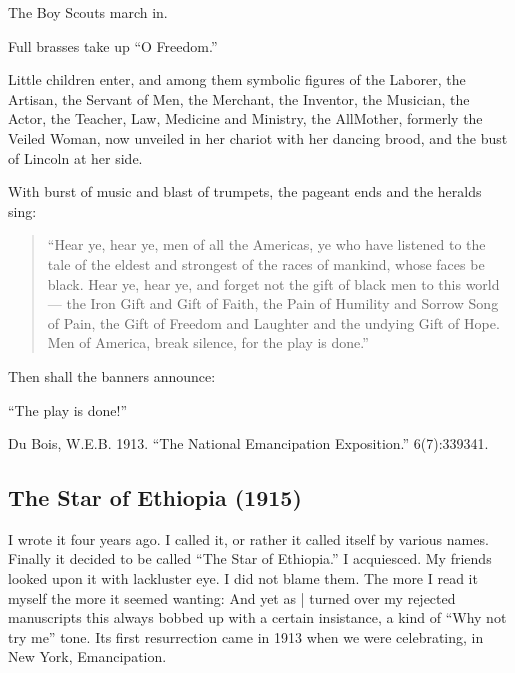\documentclass[letterpaper,10pt,english]{jupyterBook}
\begin{document}
\sphinxAtStartPar
The Boy Scouts march in.

\sphinxAtStartPar
Full brasses take up “O Freedom.”

\sphinxAtStartPar
Little children enter, and among them symbolic figures of the Laborer, the Artisan, the Servant of Men, the Merchant, the Inventor, the Musician, the Actor, the Teacher, Law, Medicine and Ministry, the All\sphinxhyphen{}Mother, formerly the Veiled Woman, now unveiled in her chariot with her dancing brood, and the bust of Lincoln at her side.

\sphinxAtStartPar
With burst of music and blast of trumpets, the pageant ends and the heralds sing:
\begin{quote}

\sphinxAtStartPar
“Hear ye, hear ye, men of all the Americas, ye who have listened to the tale of the eldest and strongest of the races of mankind, whose faces be black. Hear ye, hear ye, and forget not the gift of black men to this world— the Iron Gift and Gift of Faith, the Pain of Humility and Sorrow Song of Pain, the Gift of Freedom and Laughter and the undying Gift of Hope. Men of America, break silence, for the play is done.”
\end{quote}

\sphinxAtStartPar
Then shall the banners announce:

\sphinxAtStartPar
“The play is done!”

\sphinxAtStartPar
{} Du Bois, W.E.B. 1913. “The National Emancipation Exposition.”  6(7):339\sphinxhyphen{}341.


\subsection{The Star of Ethiopia (1915)}
\label{\detokenize{Volumes/11/02/star_of_ethiopia:the-star-of-ethiopia-1915}}\label{\detokenize{Volumes/11/02/star_of_ethiopia::doc}}
\sphinxAtStartPar
I wrote it four years ago. I called it, or rather it called itself by various names. Finally it decided to be called “The Star of Ethiopia.” I acquiesced. My friends looked upon it with lack\sphinxhyphen{}luster eye. I did not blame them. The more I read it myself the more it seemed wanting: And yet as | turned over my rejected manuscripts this always bobbed up with a certain insistance, a kind of “Why not try me” tone. Its first resurrection came in 1913 when we were celebrating, in New York, Emancipation.
\end{document}
